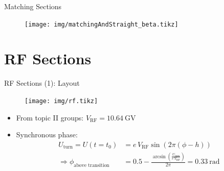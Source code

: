 \documentclass{beamer}
\begin{document}
\begin{frame}[t,fragile]{Matching Sections}
\begin{figure}
\centering
\texttt{[image: img/matchingAndStraight\_beta.tikz]}
\end{figure}
\end{frame}

\section{RF Sections}
\begin{frame}[t,fragile]{RF Sections (1): Layout}
\begin{figure}
\centering
\texttt{[image: img/rf.tikz]}
\end{figure}
\begin{itemize}
\item From topic II groups: $V_\text{RF}=\SI{10.64}{\giga\volt}$
\item Synchronous phase:
\begin{align*}
U_\text{turn} = U(t=t_0) &= e\,V_\text{RF} \sin\left(2\pi(\phi-h)\right)\\
\Rightarrow \phi_\text{above transition} &= 0.5 - \frac{\arcsin\left(\frac{U_\text{turn}}{e\,V_\text{RF}}\right)}{2\pi} = \SI{0.33}{\radian}
\end{align*}
\end{itemize}
\end{frame}
\end{document}
